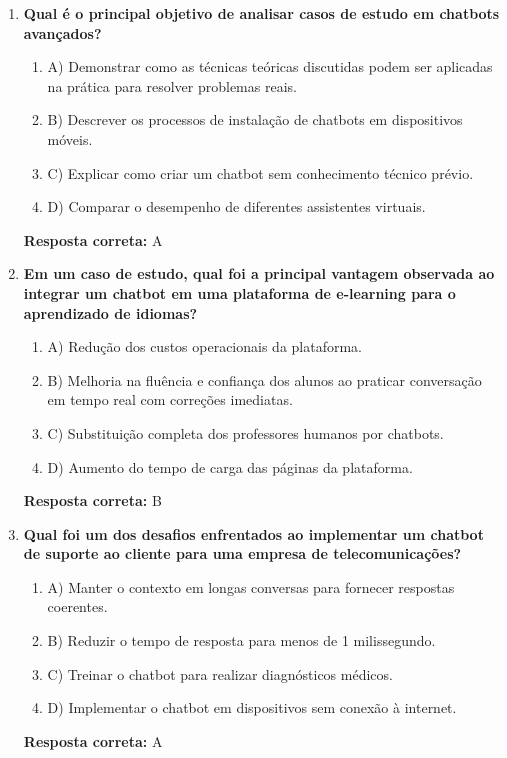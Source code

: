 \documentclass[14pt,a4paper,oneside]{book}
\begin{document}
\begin{enumerate}
	
	\item \textbf{Qual é o principal objetivo de analisar casos de estudo em chatbots avançados?}
	\begin{enumerate}[label=\alph*)]
		\item A) Demonstrar como as técnicas teóricas discutidas podem ser aplicadas na prática para resolver problemas reais.
		\item B) Descrever os processos de instalação de chatbots em dispositivos móveis.
		\item C) Explicar como criar um chatbot sem conhecimento técnico prévio.
		\item D) Comparar o desempenho de diferentes assistentes virtuais.
	\end{enumerate}
	\vspace{5mm}
	\textbf{Resposta correta:} A
	
	\item \textbf{Em um caso de estudo, qual foi a principal vantagem observada ao integrar um chatbot em uma plataforma de e-learning para o aprendizado de idiomas?}
	\begin{enumerate}[label=\alph*)]
		\item A) Redução dos custos operacionais da plataforma.
		\item B) Melhoria na fluência e confiança dos alunos ao praticar conversação em tempo real com correções imediatas.
		\item C) Substituição completa dos professores humanos por chatbots.
		\item D) Aumento do tempo de carga das páginas da plataforma.
	\end{enumerate}
	\vspace{5mm}
	\textbf{Resposta correta:} B
	
	\item \textbf{Qual foi um dos desafios enfrentados ao implementar um chatbot de suporte ao cliente para uma empresa de telecomunicações?}
	\begin{enumerate}[label=\alph*)]
		\item A) Manter o contexto em longas conversas para fornecer respostas coerentes.
		\item B) Reduzir o tempo de resposta para menos de 1 milissegundo.
		\item C) Treinar o chatbot para realizar diagnósticos médicos.
		\item D) Implementar o chatbot em dispositivos sem conexão à internet.
	\end{enumerate}
	\vspace{5mm}
	\textbf{Resposta correta:} A
	

\end{enumerate}
\end{document}
